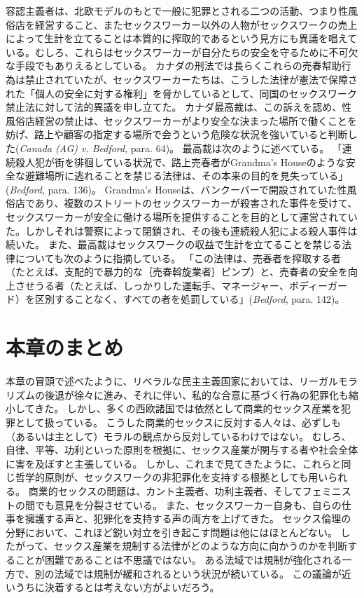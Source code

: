 \documentclass[paper=a4,book,openany]{jlreq}
\begin{document}
容認主義者は、北欧モデルのもとで一般に犯罪とされる二つの活動、つまり性風俗店を経営すること、またセックスワーカー以外の人物がセックスワークの売上によって生計を立てることは本質的に搾取的であるという見方にも異議を唱えている。むしろ、これらはセックスワーカーが自分たちの安全を守るために不可欠な手段でもありえるとしている。
カナダの刑法では長らくこれらの売春幇助行為は禁止されていたが、セックスワーカーたちは、こうした法律が憲法で保障された「個人の安全に対する権利」を脅かしているとして、同国のセックスワーク禁止法に対して法的異議を申し立てた。
カナダ最高裁は、この訴えを認め、性風俗店経営の禁止は、セックスワーカーがより安全な決まった場所で働くことを妨げ、路上や顧客の指定する場所で会うという危険な状況を強いていると判断した(\emph{Canada (AG) v. Bedford}, para. 64)。
最高裁は次のように述べている。
「連続殺人犯が街を徘徊している状況で、路上売春者がGrandma's Houseのような安全な避難場所に逃れることを禁じる法律は、その本来の目的を見失っている」(\emph{Bedford}, para. 136)。
Grandma's Houseは、バンクーバーで開設されていた性風俗店であり、複数のストリートのセックスワーカーが殺害された事件を受けて、セックスワーカーが安全に働ける場所を提供することを目的として運営されていた。しかしそれは警察によって閉鎖され、その後も連続殺人犯による殺人事件は続いた。
また、最高裁はセックスワークの収益で生計を立てることを禁じる法律についても次のように指摘している。
「この法律は、売春者を搾取する者（たとえば、支配的で暴力的な｛売春斡旋業者｝{ピンプ}）と、売春者の安全を向上させうる者（たとえば、しっかりした運転手、マネージャー、ボディーガード）を区別することなく、すべての者を処罰している」(\emph{Bedford}, para. 142)。
\section{本章のまとめ}

本章の冒頭で述べたように、リベラルな民主主義国家においては、リーガルモラリズムの後退が徐々に進み、それに伴い、私的な合意に基づく行為の犯罪化も縮小してきた。
しかし、多くの西欧諸国では依然として商業的セックス産業を犯罪として扱っている。
こうした商業的セックスに反対する人々は、必ずしも（あるいは主として）モラルの観点から反対しているわけではない。
むしろ、自律、平等、功利といった原則を根拠に、セックス産業が関与する者や社会全体に害を及ぼすと主張している。
しかし、これまで見てきたように、これらと同じ哲学的原則が、セックスワークの非犯罪化を支持する根拠としても用いられる。
商業的セックスの問題は、カント主義者、功利主義者、そしてフェミニストの間でも意見を分裂させている。
また、セックスワーカー自身も、自らの仕事を擁護する声と、犯罪化を支持する声の両方を上げてきた。
セックス倫理の分野において、これほど鋭い対立を引き起こす問題は他にはほとんどない。
したがって、セックス産業を規制する法律がどのような方向に向かうのかを判断することが困難であることは不思議ではない。
ある法域では規制が強化される一方で、別の法域では規制が緩和されるという状況が続いている。
この議論が近いうちに決着するとは考えない方がよいだろう。
\end{document}
